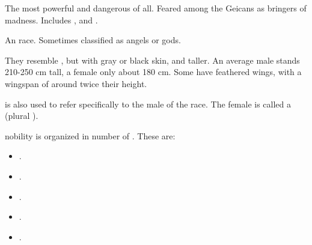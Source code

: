 \begin{gloss}
\begin{subgloss}
  \begin{comment}
  \subparagraph{Circle of Midnight}
  \end{comment}
  The most powerful and dangerous of all. 
  Feared among the Geicans as bringers of madness. 
  \index{\Bozchul}
  \index{\Nyxachel}
  \index{\Horvaleth}
  Includes \Bozchul, \Horvaleth{} and \Nyxachel{}. 
\end{subgloss}









\begin{comment}
\paragraph{\resphan}
\end{comment}
\gitem[\resphain]{\resphan}
An  race. 
Sometimes classified as angels or gods. 

They resemble , but with gray or black skin, and taller. 
An average male stands 210-250 cm tall, a female only about 180 cm. 
Some \resphain{} have feathered wings, with a wingspan of around twice their height. 


\quo{\Resphan} is also used to refer specifically to the male of the race. 
The female is called a \resvil{} (plural \resviel). 

\Resphan{} nobility is organized in number of . 
These are: 

\index{\KiriathSepher}
\index{\TiphredSerah}
\index{\Mystraacht}
\index{\Kezerad}
\index{\Baelzerach}
\begin{itemize}
  \item \KiriathSepher. 
  \item \TiphredSerah. 
  \item \Mystraacht.
  \item \Kezerad. 
  \item \Baelzerach. 
\end{itemize}


\end{gloss}
